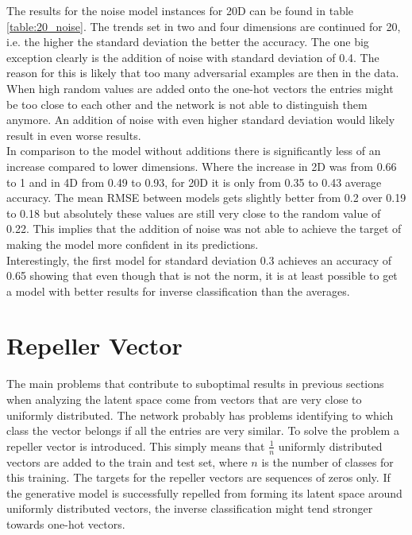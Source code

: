 The results for the noise model instances for 20D can be found in table \ref{table:20_noise}. The trends set in two and four dimensions are continued for 20, i.e. the higher the standard deviation the better the accuracy. The one big exception clearly is the addition of noise with standard deviation of 0.4. The reason for this is likely that too many adversarial examples are then in the data. When high random values are added onto the one-hot vectors the entries might be too close to each other and the network is not able to distinguish them anymore. An addition of noise with even higher standard deviation would likely result in even worse results. \\
In comparison to the model without additions there is significantly less of an increase compared to lower dimensions. Where the increase in 2D was from 0.66 to 1 and in 4D from 0.49 to 0.93, for 20D it is only from 0.35 to 0.43 average accuracy. The mean RMSE between models gets slightly better from 0.2 over 0.19 to 0.18 but absolutely these values are still very close to the random value of 0.22. This implies that the addition of noise was not able to achieve the target of making the model more confident in its predictions.\\
Interestingly, the first model for standard deviation 0.3 achieves an accuracy of 0.65 showing that even though that is not the norm, it is at least possible to get a model with better results for inverse classification than the averages.



\section{Repeller Vector}

The main problems that contribute to suboptimal results in previous sections when analyzing the latent space come from vectors that are very close to uniformly distributed. The network probably has problems identifying to which class the vector belongs if all the entries are very similar. To solve the problem a repeller vector is introduced. This simply means that $\frac{1}{n}$ uniformly distributed vectors are added to the train and test set, where $n$ is the number of classes for this training. The targets for the repeller vectors are sequences of zeros only. If the generative model is successfully repelled from forming its latent space around uniformly distributed vectors, the inverse classification might tend stronger towards one-hot vectors. 

